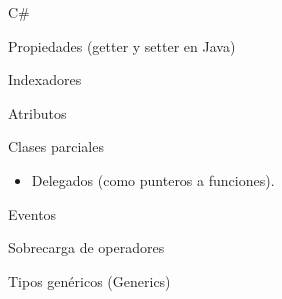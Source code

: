 \documentclass{beamer}
\begin{document}
\begin{frame}{C\#}
  \begin{exampleblock}{Propiedades (getter y setter en Java)}
    
  \end{exampleblock}
\end{frame}

\begin{frame}
  \begin{exampleblock}{Indexadores}
    
  \end{exampleblock}
\end{frame}

\begin{frame}
  \begin{exampleblock}{Atributos}
    
  \end{exampleblock}
\end{frame}

\begin{frame}
  \begin{exampleblock}{Clases parciales}
    
  \end{exampleblock}
\end{frame}

\begin{frame}
  \begin{itemize}
    \item Delegados (como punteros a funciones).
  \end{itemize}

  \pause
  \begin{exampleblock}{Eventos}
    \begin{footnotesize}
      
    \end{footnotesize}
  \end{exampleblock}
\end{frame}

\begin{frame}
  \begin{exampleblock}{Sobrecarga de operadores}
    \begin{scriptsize}
      
    \end{scriptsize}
  \end{exampleblock}
\end{frame}

\begin{frame}
  \begin{exampleblock}{Tipos genéricos (Generics)}
    \begin{scriptsize}
      
    \end{scriptsize}
  \end{exampleblock}
\end{frame}
\end{document}
